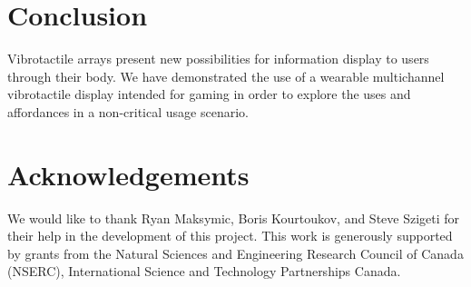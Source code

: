 \documentclass{chi-ext}
\begin{document}
\section{Conclusion}
Vibrotactile arrays present new possibilities for information display to users through their body. We have demonstrated the use of a wearable multichannel vibrotactile display intended for gaming in order to explore the uses and affordances in a non-critical usage scenario. 

\section{Acknowledgements}

We would like to thank Ryan Maksymic, Boris Kourtoukov, and Steve Szigeti for their help in the development of this project. This work is generously supported by grants from the Natural Sciences and Engineering Research Council of Canada (NSERC), International Science and Technology Partnerships Canada.

\balance


\end{document}
